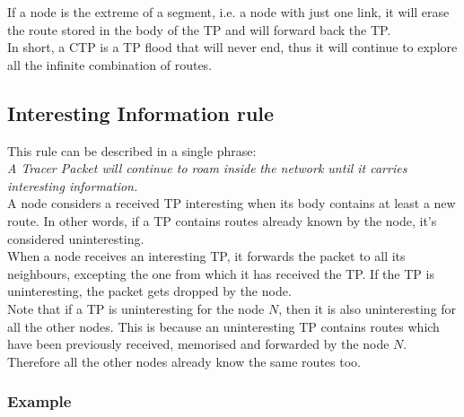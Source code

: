 \documentclass[a4paper]{article}
\newcommand{\qq}{\qquad}
\begin{document}
If a node is the extreme of a segment, i.e. a node with just one link, it will
erase the route stored in the body of the TP and will forward back the TP.\\

In short, a CTP is a TP flood that will never end, thus it will continue to
explore all the infinite combination of routes.

\subsection{Interesting Information rule}
\label{intinforule}
This rule can be described in a single phrase:\\

\emph{A Tracer Packet will continue to roam inside}
\emph{the network until it carries interesting information.}
\qq\\

A node considers a received TP interesting when its body contains at least a
new route. In other words, if a TP contains routes already known by the node,
it's considered uninteresting.\\

When a node receives an interesting TP, it forwards the packet to all its
neighbours, excepting the one from which it has received the TP.
If the TP is uninteresting, the packet gets dropped by the node.\\

Note that if a TP is uninteresting for the node $N$, then it is also
uninteresting for all the other nodes. This is because an uninteresting TP
contains routes which have been previously received, memorised and forwarded
by the node $N$. Therefore all the other nodes already know the same
routes too.

\subsubsection*{Example}
\label{sec:cycle_qv2_example}
\end{document}
